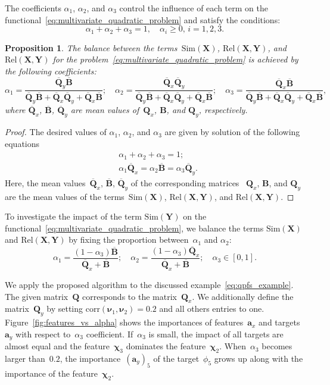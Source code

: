 \documentclass[12pt,twoside]{article}
\newtheorem{proposition}{Proposition}
\theoremstyle{definition}
\newcommand{\ba}{\mathbf{a}}
\newcommand{\bY}{\mathbf{Y}}
\newcommand{\bX}{\mathbf{X}}
\newcommand{\bB}{\mathbf{B}}
\newcommand{\bQ}{\mathbf{Q}}
\newcommand{\bchi}{\boldsymbol{\chi}}
\newcommand{\bnu}{\boldsymbol{\nu}}
\begin{document}
The coefficients $\alpha_1$, $\alpha_2$, and $\alpha_3$ control the influence of each term on the functional~\eqref{eq:multivariate_quadratic_problem} and satisfy the conditions:
\[
\alpha_1 + \alpha_2 + \alpha_3 = 1, \quad \alpha_i \geq 0, \, i = 1, 2, 3.
\]
\begin{proposition}
	The balance between the terms~$\text{Sim}(\bX)$, $\text{Rel}(\bX, \bY)$, and $\text{Rel}(\bX, \bY)$ for the problem~\eqref{eq:multivariate_quadratic_problem} is achieved by the following coefficients:
	\[
	\alpha_1 = \frac{\overline{\bQ}_y \overline{\bB} }{\overline{\bQ}_y \overline{\bB} + \overline{\bQ}_x \overline{\bQ}_y + \overline{\bQ}_x \overline{\bB}}; \quad
	\alpha_2 = \frac{\overline{\bQ}_x \overline{\bQ}_y}{\overline{\bQ}_y \overline{\bB} + \overline{\bQ}_x \overline{\bQ}_y + \overline{\bQ}_x \overline{\bB}}; \quad
	\alpha_3  = \frac{\overline{\bQ}_x \overline{\bB}}{\overline{\bQ}_y \overline{\bB} + \overline{\bQ}_x \overline{\bQ}_y + \overline{\bQ}_x \overline{\bB}},
	\]
	where $\overline{\bQ}_x$, $\overline{\bB}$, $\overline{\bQ}_y$ are mean values of~$\bQ_x$, $\bB$, and $\bQ_y$, respectively.

\end{proposition}
\begin{proof}
	The desired values of $\alpha_1$, $\alpha_2$, and $\alpha_3$ are given by solution of the following equations
	\begin{align*}
		&\alpha_1 + \alpha_2 + \alpha_3 = 1; \\
		&\alpha_1 \overline{\bQ}_x = \alpha_2 \overline{\bB} = \alpha_3 \overline{\bQ}_y.
	\end{align*}
	Here, the mean values~$\overline{\bQ}_x$, $\overline{\bB}$, $\overline{\bQ}_y$ of the corresponding matrices ~$\bQ_x$, $\bB$, and $\bQ_y$ are the mean values of the terms~$\text{Sim}(\bX)$, $\text{Rel}(\bX, \bY)$, and $\text{Rel}(\bX, \bY)$.
\end{proof}
To investigate the impact of the term $\text{Sim}(\bY)$ on the functional~\eqref{eq:multivariate_quadratic_problem}, we balance the terms $\text{Sim}(\bX)$ and $\text{Rel}(\bX, \bY)$ by fixing the proportion between~$\alpha_1$ and $\alpha_2$:
\begin{equation}
\alpha_1 = \frac{(1 - \alpha_3)\overline{\bB}}{\overline{\bQ}_x + \overline{\bB}}; \quad
\alpha_2 = \frac{(1 - \alpha_3)\overline{\bQ}_x}{\overline{\bQ}_x + \overline{\bB}}; \quad
\alpha_3 \in [0, 1].
\label{eq:alphas3}
\end{equation}

We apply the proposed algorithm to the discussed example~\eqref{eq:qpfs_example}.
The given matrix~$\bQ$ corresponds to the matrix~$\bQ_x$.
We additionally define the matrix~$\bQ_y$ by setting $\text{corr}(\bnu_1, \bnu_2) = 0.2$ and all others entries to one.
Figure~\ref{fig:features_vs_alpha} shows the importances of features~$\ba_x$ and targets~$\ba_y$ with respect to~$\alpha_3$ coefficient.
If~$\alpha_3$ is small, the impact of all targets are almost equal and the feature~$\bchi_3$ dominates the feature~$\bchi_2$. When~$\alpha_3$ becomes larger than~$0.2$, the importance~$(\ba_y)_5$ of the target~$\phi_5$ grows up along with the importance of the feature~$\bchi_2$.
\end{document}
